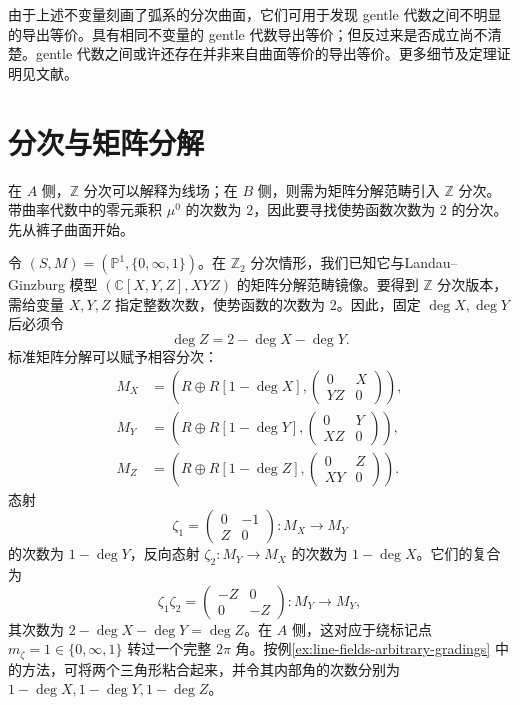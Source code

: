 \begin{note}[不变量与导出等价]
由于上述不变量刻画了弧系的分次曲面，它们可用于发现 gentle 代数之间不明显的导出等价。具有相同不变量的 gentle 代数导出等价；但反过来是否成立尚不清楚。gentle 代数之间或许还存在并非来自曲面等价的导出等价。更多细节及定理证明见文献。
\end{note}
\section{分次与矩阵分解}\label{sec:gradings-matrix-factorizations}
在 $A$ 侧，$\mathbb Z$ 分次可以解释为线场；在 $B$ 侧，则需为矩阵分解范畴引入 $\mathbb Z$ 分次。带曲率代数中的零元乘积 $\mu^0$ 的次数为 $2$，因此要寻找使势函数次数为 $2$ 的分次。先从裤子曲面开始。

令 $(S,M)=(\mathbb P^1,\{0,\infty,1\})$。在 $\mathbb Z_2$ 分次情形，我们已知它与\linebreak Landau--Ginzburg 模型 $(\mathbb C[X,Y,Z],XYZ)$ 的矩阵分解范畴镜像。\linebreak 要得到 $\mathbb Z$ 分次版本，需给变量 $X,Y,Z$ 指定整数次数，使势函数的次数为 $2$。因此，固定 $\deg X,\deg Y$ 后必须令
\[
  \deg Z=2-\deg X-\deg Y.
\]
标准矩阵分解可以赋予相容分次：
\[
\begin{aligned}
  M_X&=\left(R\oplus R[1-\deg X],\begin{pmatrix}0&X\\YZ&0\end{pmatrix}\right),\\
  M_Y&=\left(R\oplus R[1-\deg Y],\begin{pmatrix}0&Y\\XZ&0\end{pmatrix}\right),\\
  M_Z&=\left(R\oplus R[1-\deg Z],\begin{pmatrix}0&Z\\XY&0\end{pmatrix}\right).
\end{aligned}
\]
态射
\[
  \zeta_1=\begin{pmatrix}0&-1\\Z&0\end{pmatrix}\colon M_X\longrightarrow M_Y
\]
的次数为 $1-\deg Y$，反向态射 $\zeta_2\colon M_Y\to M_X$ 的次数为 $1-\deg X$。它们的复合为
\[
  \zeta_1\zeta_2=
  \begin{pmatrix}-Z&0\\0&-Z\end{pmatrix}\colon M_Y\longrightarrow M_Y,
\]
其次数为 $2-\deg X-\deg Y=\deg Z$。在 $A$ 侧，这对应于绕标记点 $m_\zeta=1\in\{0,\infty,1\}$ 转过一个完整 $2\pi$ 角。按例\ref{ex:line-fields-arbitrary-gradings} 中的方法，可将两个三角形粘合起来，并令其内部角的次数分别为 $1-\deg X,1-\deg Y,1-\deg Z$。

